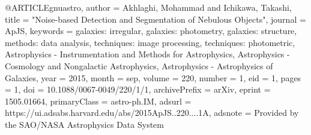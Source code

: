 
@ARTICLE{gnuastro,
       author = {{Akhlaghi}, Mohammad and {Ichikawa}, Takashi},
        title = "{Noise-based Detection and Segmentation of Nebulous Objects}",
      journal = {ApJS},
     keywords = {galaxies: irregular, galaxies: photometry, galaxies: structure, methods: data analysis, techniques: image processing, techniques: photometric, Astrophysics - Instrumentation and Methods for Astrophysics, Astrophysics - Cosmology and Nongalactic Astrophysics, Astrophysics - Astrophysics of Galaxies},
         year = 2015,
        month = sep,
       volume = {220},
       number = {1},
          eid = {1},
        pages = {1},
          doi = {10.1088/0067-0049/220/1/1},
archivePrefix = {arXiv},
       eprint = {1505.01664},
 primaryClass = {astro-ph.IM},
       adsurl = {https://ui.adsabs.harvard.edu/abs/2015ApJS..220....1A},
      adsnote = {Provided by the SAO/NASA Astrophysics Data System}
}
